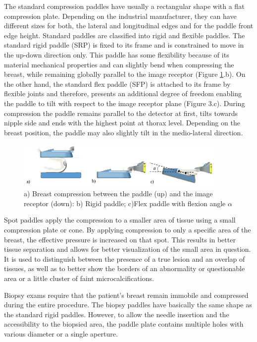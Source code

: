  The standard compression paddles have usually a rectangular shape with a flat compression plate. Depending on the industrial manufacturer, they can have different sizes for both, the lateral and longitudinal edges and for the paddle front edge height.  Standard paddles are classified into rigid and flexible paddles. The standard rigid paddle (SRP) is fixed to its frame and is constrained to move in the up-down direction only. This paddle has some flexibility because of its material mechanical properties and can slightly bend when compressing the breast, while remaining globally parallel to the image receptor (Figure \ref{fig:compressionpaddles}.b). On the other hand, the standard flex paddle (SFP)  is attached to its frame by flexible joints and therefore, presents an additional degree of freedom enabling the paddle to tilt with respect to the image receptor plane (Figure 3.c). During compression the paddle remains parallel to the detector at
first, tilts towards nipple side and ends with the highest point at
thorax level. Depending on the breast position, the paddle may also slightly tilt in the medio-lateral direction.

\begin{figure}[!h]
\centering
\includegraphics[width=0.9\textwidth,keepaspectratio]{figures/compressionpaddles.jpg} 
\caption{a) Breast compression between the paddle (up) and the image receptor (down): b) Rigid paddle; c)Flex paddle with flexion angle $\alpha$}\label{fig:compressionpaddles}
\end{figure}


 Spot paddles apply the compression to a smaller area of tissue using a small compression plate or cone. By applying compression to only a specific area of the breast, the effective pressure is increased on that spot. This results in better tissue separation and allows for better visualization of the small area in question.  It is used to distinguish between the presence of a true lesion and an overlap of tissues, as well as to better show the borders of an abnormality or questionable area or a little cluster of faint microcalcifications.  

Biopsy exams require that the patient's breast remain immobile and compressed during the entire procedure. The biopsy paddles have basically the same shape as the standard rigid paddles. However, to allow the needle insertion and the accessibility to the biopsied area, the paddle plate contains multiple holes with various diameter or a single aperture. 

